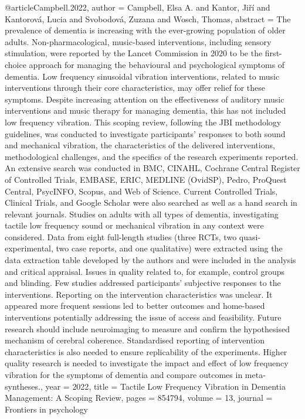 @article{Campbell.2022,
 author = {Campbell, Elsa A. and Kantor, Ji{\v{r}}{\'i} and Kantorov{\'a}, Lucia and Svobodov{\'a}, Zuzana and Wosch, Thomas},
 abstract = {The prevalence of dementia is increasing with the ever-growing population of older adults. Non-pharmacological, music-based interventions, including sensory stimulation, were reported by the Lancet Commission in 2020 to be the first-choice approach for managing the behavioural and psychological symptoms of dementia. Low frequency sinusoidal vibration interventions, related to music interventions through their core characteristics, may offer relief for these symptoms. Despite increasing attention on the effectiveness of auditory music interventions and music therapy for managing dementia, this has not included low frequency vibration. This scoping review, following the JBI methodology guidelines, was conducted to investigate participants' responses to both sound and mechanical vibration, the characteristics of the delivered interventions, methodological challenges, and the specifics of the research experiments reported. An extensive search was conducted in BMC, CINAHL, Cochrane Central Register of Controlled Trials, EMBASE, ERIC, MEDLINE (OvidSP), Pedro, ProQuest Central, PsycINFO, Scopus, and Web of Science. Current Controlled Trials, Clinical Trials, and Google Scholar were also searched as well as a hand search in relevant journals. Studies on adults with all types of dementia, investigating tactile low frequency sound or mechanical vibration in any context were considered. Data from eight full-length studies (three RCTs, two quasi-experimental, two case reports, and one qualitative) were extracted using the data extraction table developed by the authors and were included in the analysis and critical appraisal. Issues in quality related to, for example, control groups and blinding. Few studies addressed participants' subjective responses to the interventions. Reporting on the intervention characteristics was unclear. It appeared more frequent sessions led to better outcomes and home-based interventions potentially addressing the issue of access and feasibility. Future research should include neuroimaging to measure and confirm the hypothesised mechanism of cerebral coherence. Standardised reporting of intervention characteristics is also needed to ensure replicability of the experiments. Higher quality research is needed to investigate the impact and effect of low frequency vibration for the symptoms of dementia and compare outcomes in meta-syntheses.},
 year = {2022},
 title = {{Tactile Low Frequency Vibration in Dementia Management: A Scoping Review}},
 pages = {854794},
 volume = {13},
 journal = {{Frontiers in psychology}}
}


